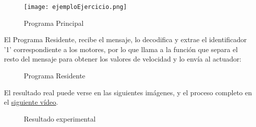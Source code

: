 \begin{figure}[h]
	\centering
	\texttt{[image: ejemploEjercicio.png]}
	\label{img:ProgramaPrincipal}
	\caption{Programa Principal}
\end{figure} 
 
El Programa Residente, recibe el mensaje, lo decodifica y extrae el identificador '1' correspondiente a los motores, por lo que llama a la función que separa el resto del mensaje para obtener los valores de velocidad y lo envía al actuador:

\begin{figure}[H]
	\centering
	\begin{subfigure}
		[Extraer el identificador]{
			\texttt{[image: ejemploEjercicio2.png]}
			\label{img:ejemplo2}}
	\end{subfigure}
	\begin{subfigure}
		[Decodificar mensaje completo]{
			\texttt{[image: ejemploEjercicio3.png]}
			\label{img:ejemplo3}}
	\end{subfigure}
	\label{img:ProgramaResidente}
	\caption{Programa Residente}
\end{figure}

El resultado real puede verse en las siguientes imágenes, y el proceso completo en el \href{https://www.youtube.com/watch?v=GbFC0OJPLk0}{siguiente vídeo}.


\begin{figure}[H]
	\centering
	\begin{subfigure}[b]
		[Ejecución programa Principal]{
			\centering
			\texttt{[image: ejemploEjercicio4.png]}
			\label{img:ejemplo4}}
	\end{subfigure}
\newline
	\begin{subfigure}[b]
		[mBot]{
			\centering
			\texttt{[image: ejemploEjercicio5.png]}
			\label{img:ejemplo5}}
	\end{subfigure}
	\label{img:Resultadoexperimental}
	\caption{Resultado experimental}
\end{figure}